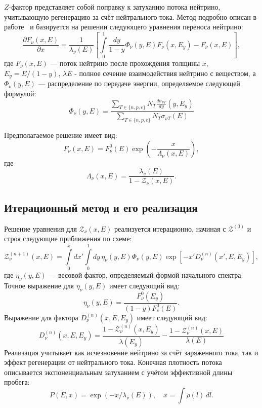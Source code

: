 $Z$-фактор представляет собой поправку к затуханию потока нейтрино, учитывающую регенерацию за счёт нейтрального тока. Метод подробно описан в работе~\cite{naumov1999} и базируется на решении следующего уравнения переноса нейтрино:
\begin{equation}
\frac{\partial F_{\nu}(x,E)}{\partial x} = \frac{1}{\lambda_{\nu}(E)}\left[ \int\limits_0^1\frac{dy}{1-y}\Phi_{\nu}(y,E) F_{\nu}(x,E_y) - F_{\nu}(x,E) \right],
\end{equation}
где $F_{\nu}(x,E)$ — поток нейтрино после прохождения толщины $x$, $E_y = E/(1-y)$, $\lambda{E}$ - полное сечение взаимодействия нейтрино с веществом, а $\Phi_{\nu}(y,E)$ — распределение по передаче энергии, определяемое следующей формулой:
\begin{equation}
    \Phi_{\nu}(y,E) = \frac{\sum\limits_{T\in \{n,p,e\}}N_T\frac{d\sigma_{\nu T}}{dy}(y,E_y)}{\sum\limits_{T\in \{n,p,e\}}N_T\sigma_{\nu T}(E)}
\end{equation}

Предполагаемое решение имеет вид:
\begin{equation}
F_{\nu}(x,E) = F^{0}_{\nu}(E)\exp\left(-\frac{x}{\Lambda_{\nu}(x,E)}\right),
\end{equation}
где 
\begin{equation}
\Lambda_{\nu}(x,E) = \frac{\lambda_{\nu}(E)}{1 - \mathcal{Z}_{\nu}(x,E)}.
\end{equation}

\subsection{Итерационный метод и его реализация}

Решение уравнения для $\mathcal{Z}_{\nu}(x,E)$ реализуется итерационно, начиная с $\mathcal{Z}^{(0)}$ и строя следующие приближения по схеме:
\begin{equation}
\mathcal{Z}^{(n+1)}_{\nu}(x,E) = \int\limits_0^x dx' \int\limits_0^1 dy\,\eta_{\nu}(y,E)\Phi_{\nu}(y,E)\exp\left[ -x'D^{(n)}_{\nu}(x',E,E_y) \right],
\end{equation}
где $\eta_{\nu}(y,E)$ — весовой фактор, определяемый формой начального спектра. Точное выражение для $\eta_{\nu}(y,E)$ имеет следующий вид: 
\begin{equation}
    \eta_{\nu}(y,E) = \frac{F^0_{\nu}(E_y)}{(1-y)F^0_{\nu}(E)}.
\end{equation}
Выражение для фактора $D^{(n)}_{\nu}(x, E, E_y)$ имеет следующий вид:
\begin{equation}
    D^{(n)}_{\nu}(x, E, E_y) = \frac{1-\mathcal{Z}_{\nu}^{(n)}(x, E_y)}{\lambda(E_y)} - \frac{1-\mathcal{Z}_{\nu}^{(n)}(x, E)}{\lambda(E)}
\end{equation}
Реализация учитывает как исчезновение нейтрино за счёт заряженного тока, так и эффект регенерации от нейтрального тока. Конечная плотность потока описывается экспоненциальным затуханием с учётом эффективной длины пробега:
\begin{equation}
P(E,x) = \exp(-x/\lambda_{\nu}(E)), \quad x = \int\rho(l)\,dl.
\end{equation}

